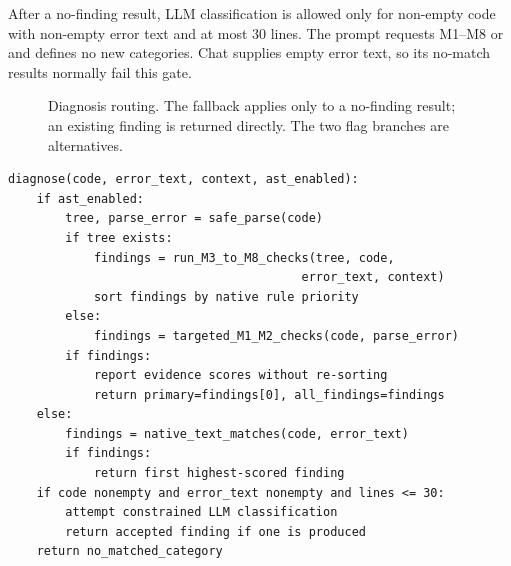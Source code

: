 After a no-finding result, LLM classification is allowed only for non-empty code with non-empty error text and at most 30 lines. The prompt requests M1--M8 or  and defines no new categories. Chat supplies empty error text, so its no-match results normally fail this gate.

\begin{figure}[htbp]
\centering
{}
\caption{Diagnosis routing. The fallback applies only to a no-finding result; an existing finding is returned directly. The two flag branches are alternatives.}
\label{fig:routing}
\end{figure}

\begin{lstlisting}[caption={Diagnosis orchestration, matching the current source-level branches.},label={alg:diagnosis}]
diagnose(code, error_text, context, ast_enabled):
    if ast_enabled:
        tree, parse_error = safe_parse(code)
        if tree exists:
            findings = run_M3_to_M8_checks(tree, code,
                                         error_text, context)
            sort findings by native rule priority
        else:
            findings = targeted_M1_M2_checks(code, parse_error)
        if findings:
            report evidence scores without re-sorting
            return primary=findings[0], all_findings=findings
    else:
        findings = native_text_matches(code, error_text)
        if findings:
            return first highest-scored finding
    if code nonempty and error_text nonempty and lines <= 30:
        attempt constrained LLM classification
        return accepted finding if one is produced
    return no_matched_category
\end{lstlisting}

